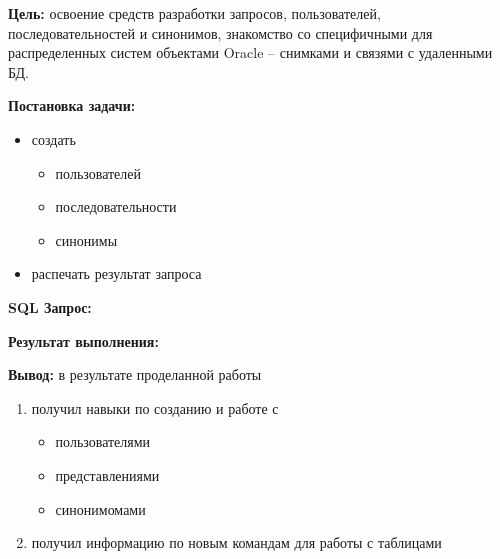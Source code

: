 \documentclass[pscyr, 12pt]{hedlab}
\begin{document}
    \makeheader
    \noindent\textbf{Цель:} освоение средств разработки запросов, пользователей, последовательностей и синонимов, знакомство со специфичными для 
    распределенных систем объектами Oracle -- снимками и связями с удаленными БД.

    \noindent\textbf{Постановка задачи:}
    \vspace*{-1em}
    \begin{itemize}\itemsep-5pt
        \item создать\vspace*{-1em}
        \begin{itemize}\itemsep-5pt
            \item пользователей
            \item последовательности
            \item синонимы
        \end{itemize}\vspace*{-0.5em}
        \item распечать результат запроса
    \end{itemize}
  
    \noindent\textbf{SQL Запрос:}
    

    \pagebreak

    \noindent\textbf{Результат выполнения:}
    

    \noindent\textbf{Вывод:} в результате проделанной работы\vspace*{-0.5em}
    \begin{enumerate}\itemsep-5pt
        \item получил навыки по созданию и работе с\vspace*{-1em}
        \begin{itemize}\itemsep-5pt
            \item пользователями
            \item представлениями
            \item синонимомами
        \end{itemize}\vspace*{-0.5em}
        \item получил информацию по новым командам для работы с таблицами
    \end{enumerate}
\end{document}
